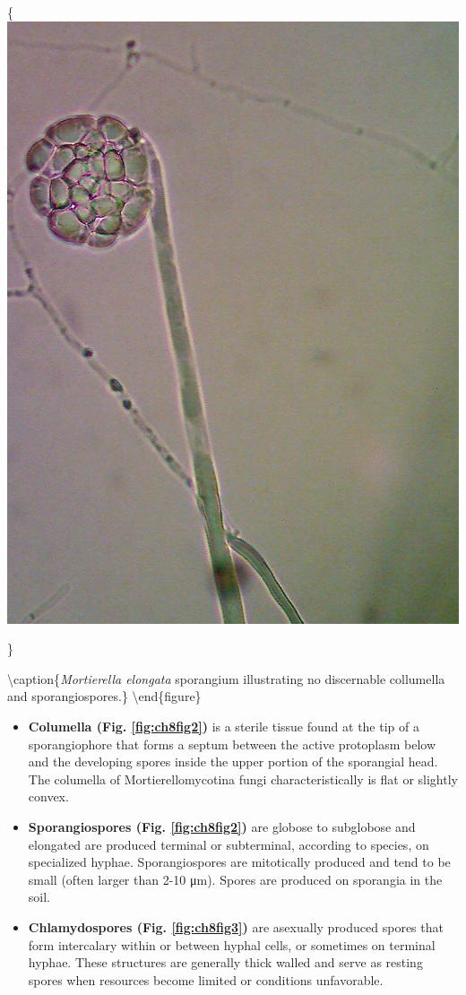 \documentclass[]{book}
\begin{document}
\{\centering \includegraphics{img/Ch8_Fig2}

\}

\textbackslash caption\{\emph{Mortierella elongata} sporangium illustrating no discernable collumella and sporangiospores.\}\label{fig:ch8fig2}
\textbackslash end\{figure\}

\begin{itemize}
\item
  \textbf{Columella (Fig. \ref{fig:ch8fig2})} is a sterile tissue found at the tip of a sporangiophore that forms a septum between the active protoplasm below and the developing spores inside the upper portion of the sporangial head. The columella of Mortierellomycotina fungi characteristically is flat or slightly convex.
\item
  \textbf{Sporangiospores (Fig. \ref{fig:ch8fig2}) } are globose to subglobose and elongated are produced terminal or subterminal, according to species, on specialized hyphae. Sporangiospores are mitotically produced and tend to be small (often larger than 2-10 μm). Spores are produced on sporangia in the soil.
\item
  \textbf{Chlamydospores (Fig. \ref{fig:ch8fig3}) } are asexually produced spores that form intercalary within or between hyphal cells, or sometimes on terminal hyphae. These structures are generally thick walled and serve as resting spores when resources become limited or conditions unfavorable.
\end{itemize}
\end{document}
